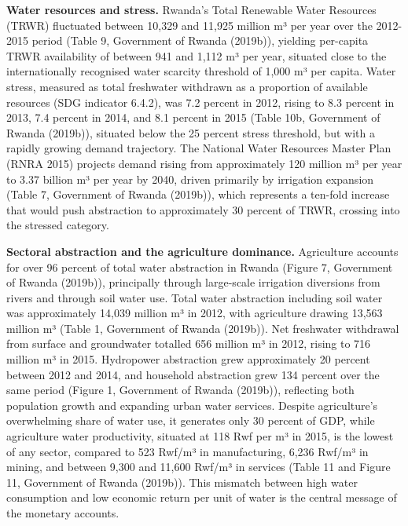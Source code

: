 \documentclass[
  letterpaper,
  DIV=11,
  numbers=noendperiod]{scrartcl}
\begin{document}
\textbf{Water resources and stress.} Rwanda's Total Renewable Water
Resources (TRWR) fluctuated between 10,329 and 11,925 million m³ per
year over the 2012-2015 period (Table 9, Government of Rwanda (2019b)),
yielding per-capita TRWR availability of between 941 and 1,112 m³ per
year, situated close to the internationally recognised water scarcity
threshold of 1,000 m³ per capita. Water stress, measured as total
freshwater withdrawn as a proportion of available resources (SDG
indicator 6.4.2), was 7.2 percent in 2012, rising to 8.3 percent in
2013, 7.4 percent in 2014, and 8.1 percent in 2015 (Table 10b,
Government of Rwanda (2019b)), situated below the 25 percent stress
threshold, but with a rapidly growing demand trajectory. The National
Water Resources Master Plan (RNRA 2015) projects demand rising from
approximately 120 million m³ per year to 3.37 billion m³ per year by
2040, driven primarily by irrigation expansion (Table 7, Government of
Rwanda (2019b)), which represents a ten-fold increase that would push
abstraction to approximately 30 percent of TRWR, crossing into the
stressed category.

\textbf{Sectoral abstraction and the agriculture dominance.} Agriculture
accounts for over 96 percent of total water abstraction in Rwanda
(Figure 7, Government of Rwanda (2019b)), principally through
large-scale irrigation diversions from rivers and through soil water
use. Total water abstraction including soil water was approximately
14,039 million m³ in 2012, with agriculture drawing 13,563 million m³
(Table 1, Government of Rwanda (2019b)). Net freshwater withdrawal from
surface and groundwater totalled 656 million m³ in 2012, rising to 716
million m³ in 2015. Hydropower abstraction grew approximately 20 percent
between 2012 and 2014, and household abstraction grew 134 percent over
the same period (Figure 1, Government of Rwanda (2019b)), reflecting
both population growth and expanding urban water services. Despite
agriculture's overwhelming share of water use, it generates only 30
percent of GDP, while agriculture water productivity, situated at 118
Rwf per m³ in 2015, is the lowest of any sector, compared to 523 Rwf/m³
in manufacturing, 6,236 Rwf/m³ in mining, and between 9,300 and 11,600
Rwf/m³ in services (Table 11 and Figure 11, Government of Rwanda
(2019b)). This mismatch between high water consumption and low economic
return per unit of water is the central message of the monetary
accounts.
\end{document}
